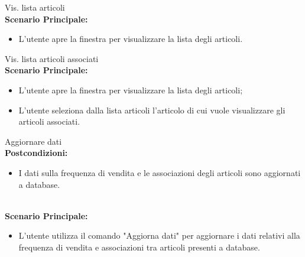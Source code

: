 \begin{usecase}{1}{Vis. lista articoli}
\textbf{\\Scenario Principale:}
\begin{itemize}
    \item L'utente apre la finestra per visualizzare la lista degli articoli.
\end{itemize}
\label{uc:scenario-principale}
\end{usecase}
\begin{usecase}{2}{Vis. lista articoli associati}
\textbf{\\Scenario Principale:}
\begin{itemize}
    \item L'utente apre la finestra per visualizzare la lista degli articoli;
    \item L'utente seleziona dalla lista articoli l'articolo di cui vuole visualizzare gli articoli associati.
\end{itemize}
\label{uc:scenario-principale}
\end{usecase}
\begin{usecase}{3}{Aggiornare dati}
\textbf{\\Postcondizioni:}
\begin{itemize}
    \item I dati sulla frequenza di vendita e le associazioni degli articoli sono aggiornati a database.
\end{itemize}
\textbf{\\Scenario Principale:}
\begin{itemize}
    \item L'utente utilizza il comando "Aggiorna dati" per aggiornare i dati relativi alla frequenza di vendita e associazioni tra articoli presenti a database.
\end{itemize}
\label{uc:scenario-principale}
\end{usecase}
